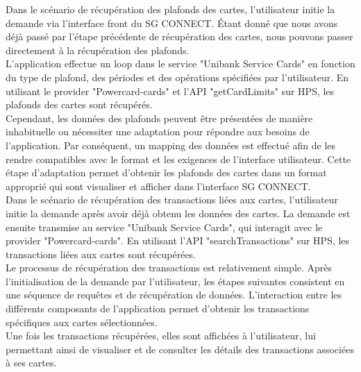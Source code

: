 Dans le scénario de récupération des plafonds des cartes, l'utilisateur initie la demande via l'interface front du SG CONNECT. Étant donné que nous avons déjà passé par l'étape précédente de récupération des cartes, nous pouvons passer directement à la récupération des plafonds.\\
L'application effectue un loop dans le service "Unibank Service Cards" en fonction du type de plafond, des périodes et des opérations spécifiées par l'utilisateur. En utilisant le provider "Powercard-cards" et l'API "getCardLimits" sur HPS, les plafonds des cartes sont récupérés.\\
Cependant, les données des plafonds peuvent être présentées de manière inhabituelle ou nécessiter une adaptation pour répondre aux besoins de l'application. Par conséquent, un mapping des données est effectué afin de les rendre compatibles avec le format et les exigences de l'interface utilisateur. Cette étape d'adaptation permet d'obtenir les plafonds des cartes dans un format approprié qui sont visualiser et afficher dans l'interface SG CONNECT.\\

Dans le scénario de récupération des transactions liées aux cartes, l'utilisateur initie la demande après avoir déjà obtenu les données des cartes. La demande est ensuite transmise au service "Unibank Service Cards", qui interagit avec le provider "Powercard-cards". En utilisant l'API "searchTransactions" sur HPS, les transactions liées aux cartes sont récupérées.\\
Le processus de récupération des transactions est relativement simple. Après l'initialisation de la demande par l'utilisateur, les étapes suivantes consistent en une séquence de requêtes et de récupération de données. L'interaction entre les différents composants de l'application permet d'obtenir les transactions spécifiques aux cartes sélectionnées.\\
Une fois les transactions récupérées, elles sont affichées à l'utilisateur, lui permettant ainsi de visualiser et de consulter les détails des transactions associées à ses cartes.

\newpage
